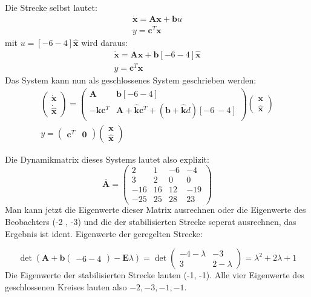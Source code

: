 \documentclass[crop=false]{standalone}
\begin{document}
\begin{task}
\begin{enumerate}[i]
\begin{solution}
\[ \]
 Die Strecke selbst lautet:
  \[ 
\begin{array}{l}\dot{\mathbf{x}}= \mathbf{A} \mathbf{x}+\mathbf{b} u\\ y=\mathbf{c}^T \mathbf{x}\end{array}
 \]
 mit $u=[-6-4] \hat{\mathbf{x}}$ wird daraus:
  \[ 
\begin{array}{l}\dot{\mathbf{x}}= \mathbf{A} \mathbf{x}+\mathbf{b}[-6-4] \hat{\mathbf{x}}\\ y=\mathbf{c}^T \mathbf{x}\end{array}
 \]
 Das System kann nun als geschlossenes System geschrieben werden:
   \[ 
\begin{array}{l}\begin{pmatrix} \dot{\mathbf{x}} \\ \dot{\hat{\mathbf{x}}} \end{pmatrix}= \begin{pmatrix} \mathbf{A} & \mathbf{b}[-6-4]\\ -\hat{\mathbf{k}} \mathbf{c}^T & \mathbf{A}+\hat{\mathbf{k}}\mathbf{c}^T+(\mathbf{b}+\hat{\mathbf{k}} d) [-6 \ -4] \end{pmatrix} \begin{pmatrix} \mathbf{x} \\ \hat{\mathbf{x}} \end{pmatrix}\\ y=\begin{pmatrix} \mathbf{c}^T & \mathbf{0} \end{pmatrix} \begin{pmatrix}\mathbf{x} \\ \hat{\mathbf{x}} \end{pmatrix}\end{array}
 \]
 
 Die Dynamikmatrix dieses Systems lautet also explizit:
 \[ \overline{\mathbf{A}} = \begin{pmatrix}2 & 1 & -6 & -4\\ 3 & 2 & 0 & 0\\ -16 & 16 & 12 & -19 \\ -25 & 25 & 28 & 23\end{pmatrix}\]
 Man kann jetzt die Eigenwerte dieser Matrix ausrechnen oder die Eigenwerte des Beobachters (-2 , -3) und die der stabilisierten Strecke seperat ausrechnen, das Ergebnis ist ident. Eigenwerte der geregelten Strecke:
 
 \[ \det \left(\mathbf{A} + \mathbf{b}\begin{pmatrix}-6 -4\end{pmatrix}-\mathbf{E}\lambda\right) = \det\begin{pmatrix}-4-\lambda & -3\\3 & 2-\lambda \end{pmatrix} = \lambda^2 + 2\lambda +1\]
 Die Eigenwerte der stabilisierten Strecke lauten (-1, -1). Alle vier Eigenwerte des geschlossenen Kreises lauten also $-2,-3,-1,-1$.
\end{solution}
 \end{enumerate}
\end{task}
\end{document}
